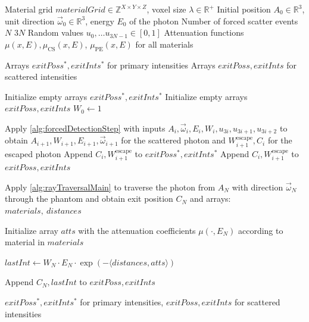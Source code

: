 \begin{algorithm}[H]
    \caption{Forced Fixed Detection: Main Algorithm}
    \label{alg:forcedDetectionMain}
    \begin{algorithmic}[1]
        \Require Material grid $materialGrid \in \mathbb{Z}^{X \times Y \times
        Z}$, voxel size $\lambda \in \mathbb{R}^+$
        \Require Initial position $A_0 \in \mathbb{R}^3$, unit direction $\vec{\omega}_0 \in \mathbb{R}^3$, energy $E_0$ of the photon
        \Require Number of forced scatter events $N$
        \Require $3N$ Random values $u_0,\ldots u_{3N-1} \in [0,1]$
        \Require Attenuation functions $\mu(x,E), \mu_\textrm{CS}(x,E)$, $\mu_\textrm{PE}(x,E)$ for all materials

        \Ensure Arrays $exitPoss^*, exitInts^*$ for primary intensities
        \Ensure Arrays $exitPoss, exitInts$ for scattered intensities

        \State Initialize empty arrays $exitPoss^*, exitInts^*$ 
        \State Initialize empty arrays $exitPoss, exitInts$
        \State $W_0 \gets 1$ 

            \State Apply \autoref{alg:forcedDetectionStep} with inputs $A_i, \vec{\omega}_i, E_i, W_i, u_{3i}, u_{3i+1}, u_{3i+2}$ to obtain
            \Statex \hspace*{\algorithmicindent} $A_{i+1}, W_{i+1}, E_{i+1}, \vec{\omega}_{i+1}$ for the scattered photon and
            \Statex \hspace*{\algorithmicindent} $W^{\text{escape}}_{i+1}, C_i$ for the escaped photon
                \State Append $C_i, W^{\text{escape}}_{i+1}$ to $exitPoss^*, exitInts^*$ 
            \Else
                \State Append $C_i, W^{\text{escape}}_{i+1}$ to $exitPoss, exitInts$ 
            \EndIf
        \EndFor

        \State Apply \autoref{alg:rayTraversalMain} to traverse the photon from $A_N$ with direction $\vec{\omega}_N$ through the phantom and obtain exit position $C_N$ and arrays: $materials,\ distances$

        \State Initialize array $atts$ with the attenuation coefficients $\mu(\cdot,
        E_N)$ according to material in $materials$

        \State $lastInt \gets W_N \cdot E_N \cdot \exp(- \langle distances , atts \rangle )$ 

        \State Append $C_N, lastInt$ to $exitPoss, exitInts$

        \State \Return $exitPoss^*, exitInts^*$ for primary intensities, $exitPoss, exitInts$ for scattered intensities
    \end{algorithmic}
\end{algorithm}

